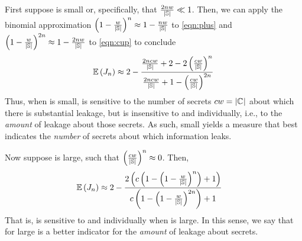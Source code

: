 \begin{compactitem}
\item 
First suppose \secretsSetSize is small or, specifically, that
$\frac{2nw}{\left|{\mathbb{S}}\right|} \ll 1$.
Then, we can apply the binomial approximation $\left(1 -
\frac{w}{\left|{\mathbb{S}}\right|}\right)^{n}
\approx 1 -
\frac{nw}{\left|{\mathbb{S}}\right|}$ to
\eqref{eqn:plus} and $\left(1 -
\frac{w}{\left|{\mathbb{S}}\right|}\right)^{2n}
\approx 1 -
\frac{2nw}{\left|{\mathbb{S}}\right|}$ to
\eqref{eqn:cup} to conclude
\begin{align}
  \mathbb{E}\left({J_{n}}\right) \approx 2 - \frac{\frac{2ncw}{\left|{\mathbb{S}}\right|}+2-2\left(\frac{cw}{\left|{\mathbb{S}}\right|}\right)^{n}}{\frac{2ncw}{\left|{\mathbb{S}}\right|}+1-\left(\frac{cw}{\left|{\mathbb{S}}\right|}\right)^{2n}}
  \label{eqn:expvJaccard-small-n}
\end{align}
Thus, when \secretsSetSize is small, \expv{\Jaccard{\secretsSetSize}}
is sensitive to the number of secrets $cw =
\left|{\mathbb{C}_{}}\right|$ about which there is substantial leakage, but
is insensitive to \classesNmbr and \classesSize individually, i.e.,
to the \textit{amount} of leakage about those secrets.  As such, small
\secretsSetSize{} yields a measure \Jaccard{\secretsSetSize} that best
indicates the \textit{number} of secrets about which information
leaks.

\item Now suppose \secretsSetSize is large, such that
  $\left(\frac{cw}{\left|{\mathbb{S}}\right|}\right)^{n} \approx 0$.  Then,
\begin{align}
  \mathbb{E}\left({J_{n}}\right)  
 & \approx 2 - \frac{2\left(c\left(1-\left(1-\frac{w}{\left|{\mathbb{S}}\right|}\right)^{n}\right) + 1\right)}
       {c\left(1-\left(1-\frac{w}{\left|{\mathbb{S}}\right|}\right)^{2n}\right) + 1}
  \label{eqn:expvJaccard-large-n}
\end{align} 
That is, \Jaccard{\secretsSetSize} is sensitive to \classesNmbr and
\classesSize individually when \secretsSetSize is large.  In this
sense, we say that \Jaccard{\secretsSetSize} for large \secretsSetSize
is a better indicator for the \textit{amount} of leakage about
secrets.
\end{compactitem}

